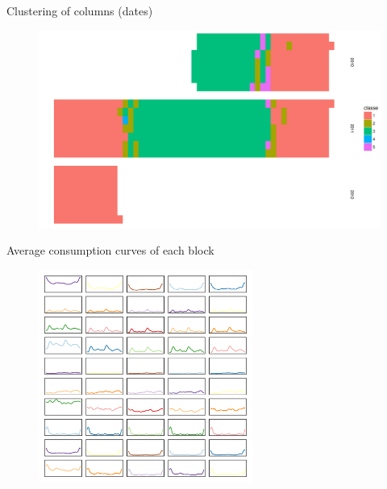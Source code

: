 \documentclass[10pt]{beamer}
\begin{document}
\begin{frame}{Clustering of columns (dates)}
\begin{figure}
\begin{centering}
\includegraphics[width=0.9\columnwidth]{images/graph-dates.pdf}
\par\end{centering}
\end{figure}
\end{frame}

\begin{frame}{Average consumption curves of each block}
\begin{figure}
\begin{centering}
\includegraphics[width=0.9\columnwidth,height=7cm]{images/graph-adjacency.pdf}
\par\end{centering}
\end{figure}
\end{frame}
\end{document}
